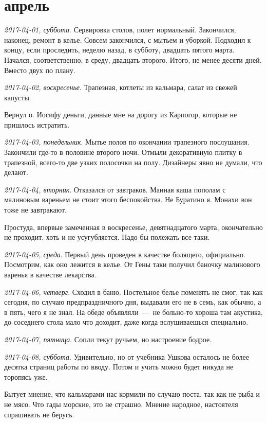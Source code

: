 \documentclass[
    12pt
    ,a4paper
    ,oneside
    ,russian
]{memoir}
\newcommand{\mydatestamp}{
    \bigskip   %
    \emph
}
\newcommand{\mds}{\mydatestamp}
\begin{document}
    \section*{апрель}

    \mds{2017-04-01, суббота}. Сервировка столов, полет нормальный. Закончился, наконец, ремонт в келье. Совсем закончился, с мытьем и уборкой. Подходил к концу, если проследить, неделю назад, в субботу, двадцать пятого марта. Начался, соответственно, в среду, двадцать второго. Итого, не менее десяти дней. Вместо двух по плану.
    
    \mds{2017-04-02, воскресенье}. Трапезная, котлеты из кальмара, салат из свежей капусты.
    
    Вернул о. Иосифу деньги, данные мне на дорогу из Карпогор, которые не пришлось истратить.
    
    \mds{2017-04-03, понедельник}. Мытье полов по окончании трапезного послушания. Закончили где-то в половине второго ночи. Отмыли декоративную плитку в трапезной, всего-то две узких полосочки на полу. Дизайнеры явно не думали, что делают.
    
    \mds{2017-04-04, вторник}. Отказался от завтраков. Манная каша пополам с малиновым вареньем не стоит этого беспокойства. Не Буратино я. Монахи вон тоже не завтракают.
    
    Простуда, впервые замеченная в воскресенье, девятнадцатого марта, окончательно не проходит, хоть и не усугубляется. Надо бы полежать все-таки.
    
    \mds{2017-04-05, среда}. Первый день проведен в качестве болящего, официально. Посмотрим, как оно лежится в келье. От Гены таки получил баночку малинового варенья в качестве лекарства.
    
    \mds{2017-04-06, четверг}. Сходил в баню. Постельное белье поменять не смог, так как сегодня, по случаю предпраздничного дня, выдавали его не в семь, как обычно, а в пять, чего я не знал. На обеде объявляли~---~не больно-то хороша там акустика, до соседнего стола мало что доходит, даже когда вслушиваешься специально.
    
    \mds{2017-04-07, пятница}. Сопли текут ручьем, но настроение бодрое.
    
    \mds{2017-04-08, суббота}. Удивительно, но от учебника Ушкова осталось не более десятка страниц работы по вводу. Потом и учить можно будет никуда не торопясь уже.
    
    Бытует мнение, что кальмарами нас кормили по случаю поста, так как не рыба и не мясо. Что гады морские, это не страшно. Мнение народное, настоятеля спрашивать не берусь.
    
\end{document}
